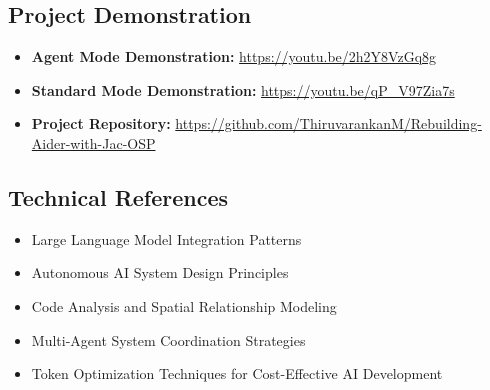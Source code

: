 \documentclass[12pt,a4paper]{article}
\begin{document}
\subsection{Project Demonstration}
\begin{itemize}
    \item \textbf{Agent Mode Demonstration:} \href{https://youtu.be/2h2Y8VzGq8g}{\color{cyan}https://youtu.be/2h2Y8VzGq8g}
    \item \textbf{Standard Mode Demonstration:} \href{https://youtu.be/qP_V97Zia7s}{\color{cyan}https://youtu.be/qP_V97Zia7s}
    \item \textbf{Project Repository:} \href{https://github.com/ThiruvarankanM/Rebuilding-Aider-with-Jac-OSP}{\color{cyan}https://github.com/ThiruvarankanM/Rebuilding-Aider-with-Jac-OSP}
\end{itemize}

\subsection{Technical References}
\begin{itemize}
    \item Large Language Model Integration Patterns
    \item Autonomous AI System Design Principles  
    \item Code Analysis and Spatial Relationship Modeling
    \item Multi-Agent System Coordination Strategies
    \item Token Optimization Techniques for Cost-Effective AI Development
\end{itemize}
\end{document}

